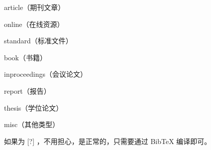 \documentclass[oneside]{cdut_thesis} %
\begin{document}
article（期刊文章）\cite{article_example}

online（在线资源）\cite{online_example}

standard（标准文件）\cite{standard_example}

book（书籍）\cite{book_example}

inproceedings（会议论文）\cite{inproceedings_example}

report（报告）\cite{report_example}

thesis（学位论文）\cite{thesis_example}

misc（其他类型）\cite{misc_example}

如果为 [?] ，不用担心，是正常的，只需要通过 BibTeX  编译即可。




\null\par
{}



\end{document}
